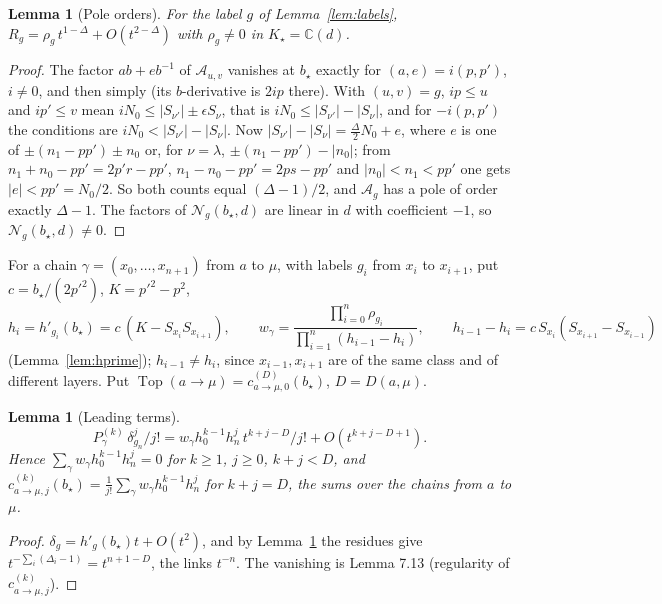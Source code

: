 \documentclass[11pt]{article}
\newtheorem{lemma}[theorem]{Lemma}
\theoremstyle{remark}
\begin{document}
\begin{lemma}[Pole orders]\label{lem:poles}
For the label $g$ of Lemma~\ref{lem:labels},
$R_g=\rho_g\,t^{1-\Delta}+O(t^{2-\Delta})$ with $\rho_g\neq0$ in
$K_\star=\mathbb C(d)$.
\end{lemma}

\begin{proof}
The factor $ab+eb^{-1}$ of $\mathcal A_{u,v}$ vanishes at $b_\star$ exactly
for $(a,e)=i(p,p')$, $i\ne0$, and then simply (its $b$-derivative is $2ip$
there).  With $(u,v)=g$, $ip\le u$ and $ip'\le v$ mean
$iN_0\le|S_{\nu'}|\pm\epsilon S_\nu$, that is $iN_0\le|S_{\nu'}|-|S_\nu|$, and for
$-i(p,p')$ the conditions are $iN_0<|S_{\nu'}|-|S_\nu|$.  Now
$|S_{\nu'}|-|S_\nu|=\frac\Delta2N_0+e$, where $e$ is one of
$\pm(n_1-pp')\pm n_0$ or, for $\nu=\lambda$, $\pm(n_1-pp')-|n_0|$; from
$n_1+n_0-pp'=2p'r-pp'$, $n_1-n_0-pp'=2ps-pp'$ and $|n_0|<n_1<pp'$ one gets
$|e|<pp'=N_0/2$.  So both counts equal $(\Delta-1)/2$, and $\mathcal A_g$ has
a pole of order exactly $\Delta-1$.  The factors of $\mathcal N_g(b_\star,d)$
are linear in $d$ with coefficient $-1$, so $\mathcal N_g(b_\star,d)\ne0$.
\end{proof}

For a chain $\gamma=(x_0,\dots,x_{n+1})$ from $a$ to $\mu$, with labels
$g_i$ from $x_i$ to $x_{i+1}$, put $c=b_\star/(2p'^2)$, $K=p'^2-p^2$,
\[
 h_i=h'_{g_i}(b_\star)=c\,(K-S_{x_i}S_{x_{i+1}}),\qquad
 w_\gamma=\frac{\prod_{i=0}^n\rho_{g_i}}{\prod_{i=1}^n(h_{i-1}-h_i)},\qquad
 h_{i-1}-h_i=c\,S_{x_i}(S_{x_{i+1}}-S_{x_{i-1}})
\]
(Lemma~\ref{lem:hprime}); $h_{i-1}\ne h_i$, since $x_{i-1},x_{i+1}$ are of the
same class and of different layers.  Put
$\operatorname{Top}(a\to\mu)=c^{(D)}_{a\to\mu,0}(b_\star)$, $D=D(a,\mu)$.

\begin{lemma}[Leading terms]\label{lem:leading}
\[
 P^{(k)}_\gamma\,\delta_{g_n}^j/j!=w_\gamma h_0^{k-1}h_n^j\,t^{k+j-D}/j!+O(t^{k+j-D+1}).
\]
Hence $\sum_\gamma w_\gamma h_0^{k-1}h_n^j=0$ for $k\ge1$, $j\ge0$, $k+j<D$,
and $c^{(k)}_{a\to\mu,j}(b_\star)=\frac1{j!}\sum_\gamma w_\gamma h_0^{k-1}h_n^j$
for $k+j=D$, the sums over the chains from $a$ to $\mu$.
\end{lemma}

\begin{proof}
$\delta_g=h'_g(b_\star)t+O(t^2)$, and by Lemma~\ref{lem:poles} the residues give
$t^{-\sum_i(\Delta_i-1)}=t^{n+1-D}$, the links $t^{-n}$.  The vanishing is
Lemma 7.13 (regularity of $c^{(k)}_{a\to\mu,j}$).
\end{proof}
\end{document}
